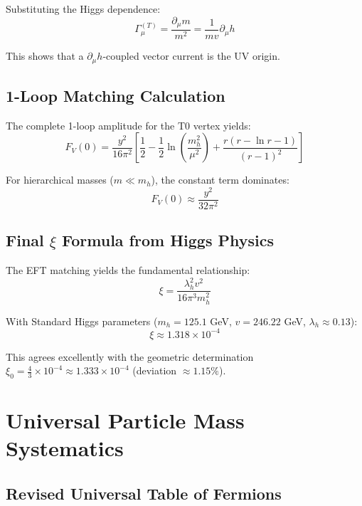 	Substituting the Higgs dependence:
	\begin{equation}
		\Gamma_\mu^{(T)} = \frac{\partial_\mu m}{m^2} = \frac{1}{mv}\partial_\mu h
	\end{equation}
	
	This shows that a $\partial_\mu h$-coupled vector current is the UV origin.
	
	\subsection{1-Loop Matching Calculation}
	\label{subsec:one_loop_matching}
	
	The complete 1-loop amplitude for the T0 vertex yields:
	\begin{equation}
		F_V(0) = \frac{y^2}{16\pi^2}\left[\frac{1}{2} - \frac{1}{2}\ln\left(\frac{m_h^2}{\mu^2}\right) + \frac{r(r-\ln r-1)}{(r-1)^2}\right]
	\end{equation}
	
	For hierarchical masses ($m \ll m_h$), the constant term dominates:
	\begin{equation}
		F_V(0) \approx \frac{y^2}{32\pi^2}
	\end{equation}
	
	\subsection{Final $\xi$ Formula from Higgs Physics}
	\label{subsec:final_xi_formula}
	
	The EFT matching yields the fundamental relationship:
	\begin{equation}
		\boxed{\xi = \frac{\lambda_h^2 v^2}{16\pi^3 m_h^2}}
	\end{equation}
	
	With Standard Higgs parameters ($m_h = 125.1$ GeV, $v = 246.22$ GeV, $\lambda_h \approx 0.13$):
	\begin{equation}
		\xi \approx 1.318 \times 10^{-4}
	\end{equation}
	
	This agrees excellently with the geometric determination $\xi_0 = \frac{4}{3} \times 10^{-4} \approx 1.333 \times 10^{-4}$ (deviation $\approx 1.15\%$).
	
	\section{Universal Particle Mass Systematics}
	\label{sec:universal_masses}
	
	\subsection{Revised Universal Table of Fermions}
	\label{subsec:universal_table}
	
